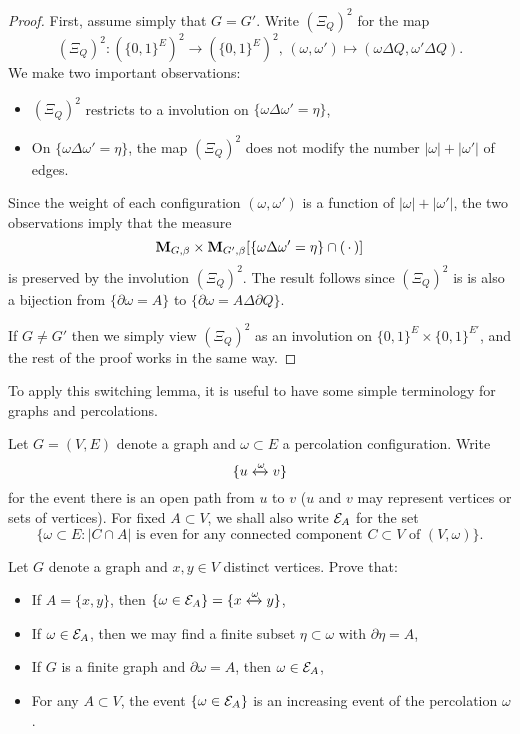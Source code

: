 \begin{proof}
    First, assume simply that $G=G'$.
    Write $(\Xi_Q)^2$ for the map
    \[
        (\Xi_Q)^2:
        (\{0,1\}^E)^2
        \to
        (\{0,1\}^E)^2
        ,\,(\omega,\omega')\mapsto (\omega\Delta Q,\omega'\Delta Q).
    \]
    We make two important observations:
    \begin{itemize}
        \item $(\Xi_Q)^2$ restricts to a involution on $\{\omega\Delta\omega'=\eta\}$,
        \item On $\{\omega\Delta\omega'=\eta\}$, the map $(\Xi_Q)^2$ does not modify the number $|\omega|+|\omega'|$
        of edges.
    \end{itemize} 
    Since the weight of each configuration $(\omega,\omega')$ is a function of $|\omega|+|\omega'|$,
    the two observations imply that
    the measure \[\mathbf{M}_{G,\beta}\times\mathbf{M}_{G',\beta}
        [\{\omega\Delta\omega'=\eta\}\cap (\,\cdot\,)]\] is preserved by the involution
    $(\Xi_Q)^2$.
    The result follows since $(\Xi_Q)^2$ is is also a bijection from $\{\partial\omega= A\}$
    to $\{\partial\omega= A\Delta \partial Q\}$.

    If $G\neq G'$ then we simply view $(\Xi_Q)^2$
    as an involution on $\{0,1\}^E\times\{0,1\}^{E'}$,
    and the rest of the proof works in the same way.
\end{proof}

To apply this switching lemma,
it is useful to have some simple terminology for graphs and percolations.

\begin{definition}
    Let $G=(V,E)$ denote a graph and $\omega\subset E$ a percolation configuration.
    Write \[\{u\xleftrightarrow{\omega}v\}\]
    for the event there is an open path from $u$ to $v$
    ($u$ and $v$ may represent vertices or sets of vertices).
    For fixed $A\subset V$, we shall also write $\mathcal E_A$ for the set
    \[
        \{\omega\subset E:\text{$|C\cap A|$ is even for any connected component $C\subset V$ of $(V,\omega)$}\}.
    \]
\end{definition}

\begin{exercise}
    \label{exo:basic_perco}
    Let $G$ denote a graph and 
    $x,y\in V$  distinct vertices. Prove that:
    \begin{itemize}
        \item If $A=\{x,y\}$, then $\{\omega\in\mathcal E_A\}=\{x\xleftrightarrow{\omega}y\}$,
        \item If $\omega\in\mathcal E_A$, then we may find a finite subset $\eta\subset\omega$ with $\partial\eta=A$,
        \item If $G$ is a finite graph and $\partial\omega=A$, then $\omega\in\mathcal E_A$,
        \item For any $A\subset V$, the event $\{\omega\in\mathcal E_A\}$ is an increasing event of the percolation $\omega$.
    \end{itemize}
\end{exercise}

